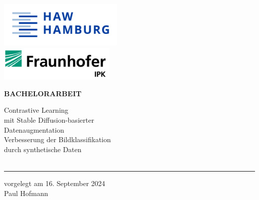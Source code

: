 \begin{titlepage}
  \color{haw}
  \raggedright
  \hfill\includegraphics[width=6cm]{HAW_Marke_RGB_300dpi}\\
  \vspace{0.5cm}
  \hfill\includegraphics[width=5.6cm]{Fraunhofer-IPK_Logo}\\

  \vspace{5cm}

  \setmainfont{Open Sans}
  \small
  \textbf{BACHELORARBEIT}

  \vspace{8mm}

  \begin{minipage}{0.8\linewidth}
    \setmainfont{Martel Heavy}
    \LARGE
    Contrastive Learning\\[1mm] %
    mit Stable Diffusion-basierter\\[1mm]
    Datenaugmentation\\[4mm]
    \setmainfont{Open Sans}
    \Large
    Verbesserung der Bildklassifikation\\[1mm]
    durch synthetische Daten\\[1mm]
    \,\rule{11mm}{1.2mm}
  \end{minipage}

  \vspace{9.2mm}

  vorgelegt am 16. September 2024\\
  Paul Hofmann


\end{titlepage}
